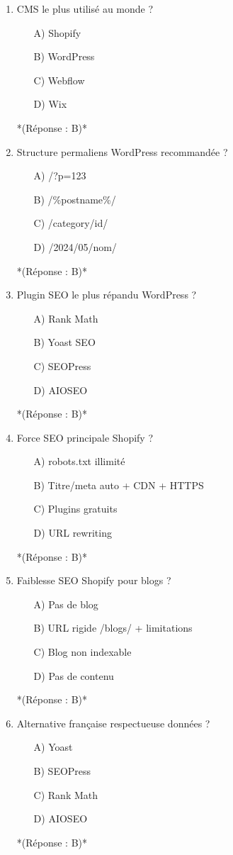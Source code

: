 \documentclass[12pt,a4paper,twoside]{report}
\begin{document}
\begin{enumerate}
\item CMS le plus utilisé au monde ?
\begin{itemize}
\item[A)] Shopify
\item[B)] WordPress
\item[C)] Webflow
\item[D)] Wix
\end{itemize}
*(Réponse : B)*

\item Structure permaliens WordPress recommandée ?
\begin{itemize}
\item[A)] /?p=123
\item[B)] /\%postname\%/
\item[C)] /category/id/
\item[D)] /2024/05/nom/
\end{itemize}
*(Réponse : B)*

\item Plugin SEO le plus répandu WordPress ?
\begin{itemize}
\item[A)] Rank Math
\item[B)] Yoast SEO
\item[C)] SEOPress
\item[D)] AIOSEO
\end{itemize}
*(Réponse : B)*

\item Force SEO principale Shopify ?
\begin{itemize}
\item[A)] robots.txt illimité
\item[B)] Titre/meta auto + CDN + HTTPS
\item[C)] Plugins gratuits
\item[D)] URL rewriting
\end{itemize}
*(Réponse : B)*

\item Faiblesse SEO Shopify pour blogs ?
\begin{itemize}
\item[A)] Pas de blog
\item[B)] URL rigide /blogs/ + limitations
\item[C)] Blog non indexable
\item[D)] Pas de contenu
\end{itemize}
*(Réponse : B)*

\item Alternative française respectueuse données ?
\begin{itemize}
\item[A)] Yoast
\item[B)] SEOPress
\item[C)] Rank Math
\item[D)] AIOSEO
\end{itemize}
*(Réponse : B)*


\end{enumerate}
\end{document}
